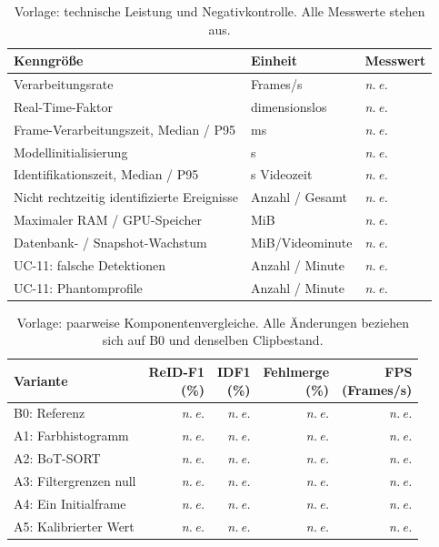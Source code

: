 \documentclass[runningheads]{llncs}
\newcommand{\evalpending}{\textit{n.\,e.}}
\begin{document}
\begin{table}[tbp]
\caption{Vorlage: technische Leistung und Negativkontrolle. Alle Messwerte stehen aus.}
\label{tab:eval-result-runtime}
\centering
\small
\begin{tabularx}{\linewidth}{@{}Xll@{}}
\toprule
Kenngröße & Einheit & Messwert \\
\midrule
Verarbeitungsrate & Frames/s & \evalpending \\
Real-Time-Faktor & dimensionslos & \evalpending \\
Frame-Verarbeitungszeit, Median / P95 & ms & \evalpending \\
Modellinitialisierung & s & \evalpending \\
Identifikationszeit, Median / P95 & s Videozeit & \evalpending \\
Nicht rechtzeitig identifizierte Ereignisse & Anzahl / Gesamt & \evalpending \\
Maximaler RAM / GPU-Speicher & MiB & \evalpending \\
Datenbank- / Snapshot-Wachstum & MiB/Videominute & \evalpending \\
UC-11: falsche Detektionen & Anzahl / Minute & \evalpending \\
UC-11: Phantomprofile & Anzahl / Minute & \evalpending \\
\bottomrule
\end{tabularx}
\end{table}

\begin{table}[tbp]
\caption{Vorlage: paarweise Komponentenvergleiche. Alle Änderungen beziehen sich auf B0 und denselben Clipbestand.}
\label{tab:eval-result-ablation}
\centering
\small
\begin{tabularx}{\linewidth}{@{}Xrrrr@{}}
\toprule
Variante & \shortstack{ReID-F1\\(\%)} & \shortstack{IDF1\\(\%)} & \shortstack{Fehlmerge\\(\%)} & \shortstack{FPS\\(Frames/s)} \\
\midrule
B0: Referenz & \evalpending & \evalpending & \evalpending & \evalpending \\
A1: Farbhistogramm & \evalpending & \evalpending & \evalpending & \evalpending \\
A2: BoT-SORT & \evalpending & \evalpending & \evalpending & \evalpending \\
A3: Filtergrenzen null & \evalpending & \evalpending & \evalpending & \evalpending \\
A4: Ein Initialframe & \evalpending & \evalpending & \evalpending & \evalpending \\
A5: Kalibrierter Wert & \evalpending & \evalpending & \evalpending & \evalpending \\
\bottomrule
\end{tabularx}
\end{table}
\end{document}
